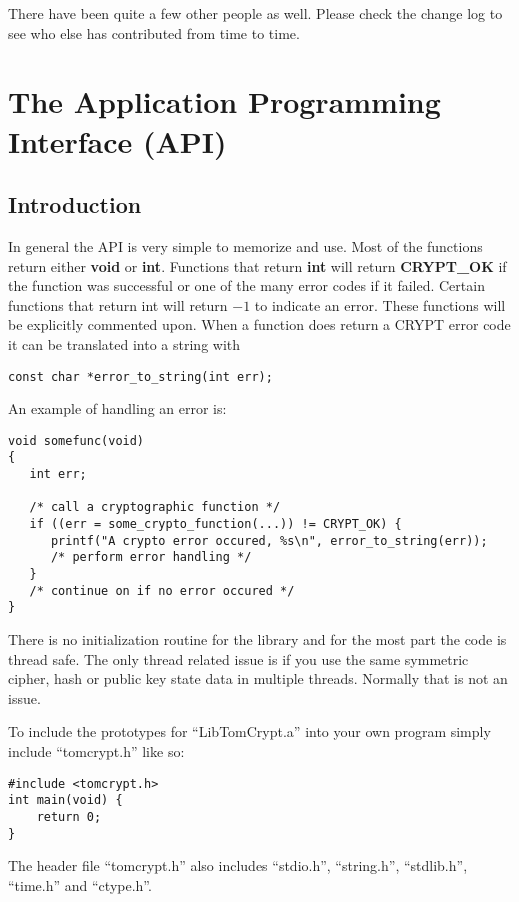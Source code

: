 \documentclass[a4paper]{book}
\begin{document}
There have been quite a few other people as well.  Please check the change log to see who else has contributed from
time to time.

\chapter{The Application Programming Interface (API)}
\section{Introduction}
 

In general the API is very simple to memorize and use.  Most of the functions return either {\bf void} or {\bf int}.  Functions
that return {\bf int} will return {\bf CRYPT\_OK} if the function was successful or one of the many error codes 
if it failed.  Certain functions that return int will return $-1$ to indicate an error.  These functions will be explicitly
commented upon.  When a function does return a CRYPT error code it can be translated into a string with

\begin{verbatim}
const char *error_to_string(int err);
\end{verbatim}

An example of handling an error is:
\begin{verbatim}
void somefunc(void)
{
   int err;
   
   /* call a cryptographic function */
   if ((err = some_crypto_function(...)) != CRYPT_OK) {
      printf("A crypto error occured, %s\n", error_to_string(err));
      /* perform error handling */
   }
   /* continue on if no error occured */
}
\end{verbatim}

There is no initialization routine for the library and for the most part the code is thread safe.  The only thread
related issue is if you use the same symmetric cipher, hash or public key state data in multiple threads.  Normally
that is not an issue.

To include the prototypes for ``LibTomCrypt.a'' into your own program simply include ``tomcrypt.h'' like so:
\begin{verbatim}
#include <tomcrypt.h>
int main(void) {
    return 0;
}
\end{verbatim}

The header file ``tomcrypt.h'' also includes ``stdio.h'', ``string.h'', ``stdlib.h'', ``time.h'' and ``ctype.h''.
\end{document}
